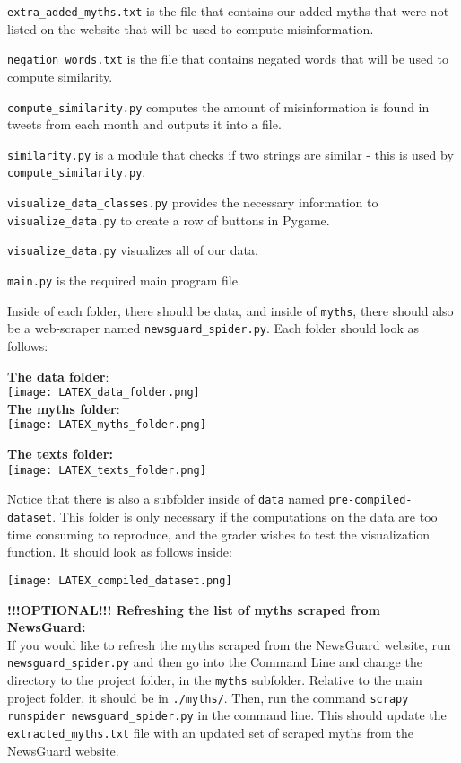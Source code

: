 \documentclass[fontsize=11pt]{article}
\begin{document}
\begin{flushleft}
        \texttt{extra\_added\_myths.txt} is the file that contains our added myths that were not listed on the website that will be used to compute misinformation.

        \texttt{negation\_words.txt} is the file that contains negated words that will be used to compute similarity.
        \hfill\break

        \texttt{compute\_similarity.py} computes the amount of misinformation is found in tweets from each month and outputs it into a file.

        \texttt{similarity.py} is a module that checks if two strings are similar - this is used by \texttt{compute\_similarity.py}.
        \hfill\break

        \texttt{visualize\_data\_classes.py} provides the necessary information to \texttt{visualize\_data.py} to create a row of buttons in Pygame.

        \texttt{visualize\_data.py} visualizes all of our data.
        \hfill\break

        \texttt{main.py} is the required main program file.
        \hfill\break

        Inside of each folder, there should be data, and inside of \texttt{myths}, there should also be a web-scraper named \texttt{newsguard\_spider.py}. Each folder should look as follows:

        \textbf{The data folder}:\\

        \texttt{[image: LATEX\_data\_folder.png]}\\
        \textbf{The myths folder}:\\
        \texttt{[image: LATEX\_myths\_folder.png]}

        \newpage

        \textbf{The texts folder:}\\

        \texttt{[image: LATEX\_texts\_folder.png]}

        Notice that there is also a subfolder inside of \texttt{data} named \texttt{pre-compiled-dataset}. This folder is only necessary if the computations on the data are too time consuming to reproduce, and the grader wishes to test the visualization function. It should look as follows inside:

        \texttt{[image: LATEX\_compiled\_dataset.png]}

        \textbf{!!!OPTIONAL!!! Refreshing the list of myths scraped from NewsGuard:}\\
        If you would like to refresh the myths scraped from the NewsGuard website, run \texttt{newsguard\_spider.py} and then go into the Command Line and change the directory to the project folder, in the \texttt{myths} subfolder. Relative to the main project folder, it should be in \texttt{./myths/}. Then, run the command \texttt{scrapy runspider newsguard\_spider.py} in the command line. This should update the \texttt{extracted\_myths.txt} file with an updated set of scraped myths from the NewsGuard website.
        \hfill\break


\end{flushleft}
\end{document}
